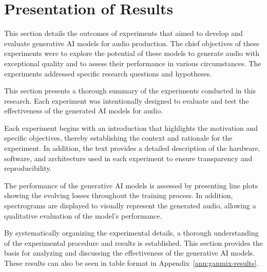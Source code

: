 \section{Presentation of Results} \label{sec:res-presentation}

This section details the outcomes of experiments that aimed to develop and evaluate generative \ac{AI} models for audio production. The chief objectives of these experiments were to explore the potential of these models to generate audio with exceptional quality and to assess their performance in various circumstances. The experiments addressed specific research questions and hypotheses. 

This section presents a thorough summary of the experiments conducted in this research. Each experiment was intentionally designed to evaluate and test the effectiveness of the generated \ac{AI} models for audio.

Each experiment begins with an introduction that highlights the motivation and specific objectives, thereby establishing the context and rationale for the experiment. In addition, the text provides a detailed description of the hardware, software, and architecture used in each experiment to ensure transparency and reproducibility.

The performance of the generative \ac{AI} models is assessed by presenting line plots showing the evolving losses throughout the training process. In addition, spectrograms are displayed to visually represent the generated audio, allowing a qualitative evaluation of the model's performance.

By systematically organizing the experimental details, a thorough understanding of the experimental procedure and results is established. This section provides the basis for analyzing and discussing the effectiveness of the generative \ac{AI} models. These results can also be seen in table format in Appendix~\ref{ann:ganmix-results}.










